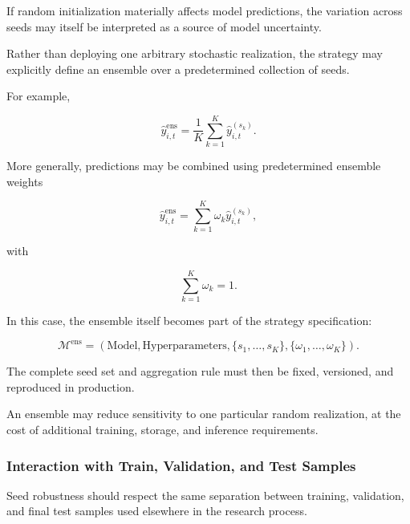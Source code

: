 \documentclass[11pt,a4paper]{article}
\begin{document}
If random initialization materially affects model predictions, the variation
across seeds may itself be interpreted as a source of model uncertainty.

Rather than deploying one arbitrary stochastic realization, the strategy may
explicitly define an ensemble over a predetermined collection of seeds.

For example,

\begin{equation}
\boxed{
\widehat{y}_{i,t}^{\mathrm{ens}}
=
\frac{1}{K}
\sum_{k=1}^{K}
\widehat{y}_{i,t}^{(s_k)}.
}
\end{equation}

More generally, predictions may be combined using predetermined ensemble
weights

\begin{equation}
\widehat{y}_{i,t}^{\mathrm{ens}}
=
\sum_{k=1}^{K}
\omega_k
\widehat{y}_{i,t}^{(s_k)},
\end{equation}

with

\begin{equation}
\sum_{k=1}^{K}\omega_k=1.
\end{equation}

In this case, the ensemble itself becomes part of the strategy specification:

\begin{equation}
\boxed{
\mathcal{M}^{\mathrm{ens}}
=
\left(
\text{Model},
\text{Hyperparameters},
\{s_1,\ldots,s_K\},
\{\omega_1,\ldots,\omega_K\}
\right).
}
\end{equation}

The complete seed set and aggregation rule must then be fixed, versioned, and
reproduced in production.

An ensemble may reduce sensitivity to one particular random realization, at the
cost of additional training, storage, and inference requirements.


\subsubsection{Interaction with Train, Validation, and Test Samples}

Seed robustness should respect the same separation between training,
validation, and final test samples used elsewhere in the research process.
\end{document}

